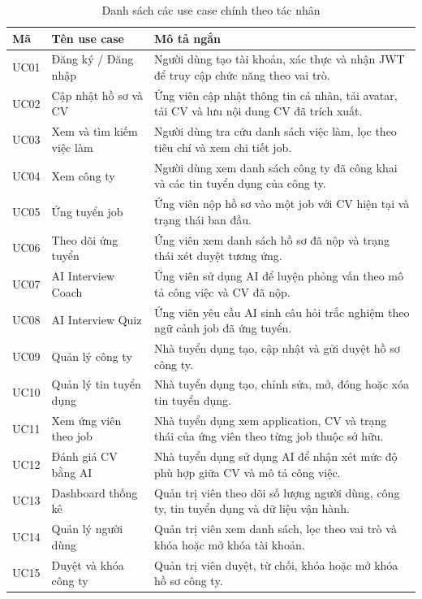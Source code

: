 \documentclass[../DoAn.tex]{subfiles}
\begin{document}
\begin{table}[H]
    \centering
    \renewcommand{\arraystretch}{1.18}
    \begin{tabular}{|p{}|p{}|p{}|}
        \hline
        \textbf{Mã} & \textbf{Tên use case} & \textbf{Mô tả ngắn} \\
        \hline
        UC01 & Đăng ký / Đăng nhập & Người dùng tạo tài khoản, xác thực và nhận JWT để truy cập chức năng theo vai trò. \\
        \hline
        UC02 & Cập nhật hồ sơ và CV & Ứng viên cập nhật thông tin cá nhân, tải avatar, tải CV và lưu nội dung CV đã trích xuất. \\
        \hline
        UC03 & Xem và tìm kiếm việc làm & Người dùng tra cứu danh sách việc làm, lọc theo tiêu chí và xem chi tiết job. \\
        \hline
        UC04 & Xem công ty & Người dùng xem danh sách công ty đã công khai và các tin tuyển dụng của công ty. \\
        \hline
        UC05 & Ứng tuyển job & Ứng viên nộp hồ sơ vào một job với CV hiện tại và trạng thái ban đầu. \\
        \hline
        UC06 & Theo dõi ứng tuyển & Ứng viên xem danh sách hồ sơ đã nộp và trạng thái xét duyệt tương ứng. \\
        \hline
        UC07 & AI Interview Coach & Ứng viên sử dụng AI để luyện phỏng vấn theo mô tả công việc và CV đã nộp. \\
        \hline
        UC08 & AI Interview Quiz & Ứng viên yêu cầu AI sinh câu hỏi trắc nghiệm theo ngữ cảnh job đã ứng tuyển. \\
        \hline
        UC09 & Quản lý công ty & Nhà tuyển dụng tạo, cập nhật và gửi duyệt hồ sơ công ty. \\
        \hline
        UC10 & Quản lý tin tuyển dụng & Nhà tuyển dụng tạo, chỉnh sửa, mở, đóng hoặc xóa tin tuyển dụng. \\
        \hline
        UC11 & Xem ứng viên theo job & Nhà tuyển dụng xem application, CV và trạng thái của ứng viên theo từng job thuộc sở hữu. \\
        \hline
        UC12 & Đánh giá CV bằng AI & Nhà tuyển dụng sử dụng AI để nhận xét mức độ phù hợp giữa CV và mô tả công việc. \\
        \hline
        UC13 & Dashboard thống kê & Quản trị viên theo dõi số lượng người dùng, công ty, tin tuyển dụng và dữ liệu vận hành. \\
        \hline
        UC14 & Quản lý người dùng & Quản trị viên xem danh sách, lọc theo vai trò và khóa hoặc mở khóa tài khoản. \\
        \hline
        UC15 & Duyệt và khóa công ty & Quản trị viên duyệt, từ chối, khóa hoặc mở khóa hồ sơ công ty. \\
        \hline
    \end{tabular}
    \caption{Danh sách các use case chính theo tác nhân}
    \label{tab:usecase-list}
\end{table}
\end{document}

